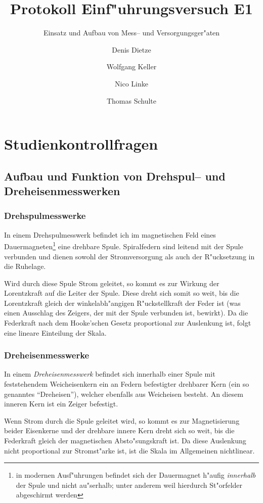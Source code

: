 \documentclass[10pt]{scrartcl}
\author{Denis Dietze \and Wolfgang Keller \and Nico Linke \and Thomas Schulte}
\title{Protokoll Einf"uhrungsversuch E1}
\subtitle{Einsatz und Aufbau von Mess-- und Versorgungsger"aten}
\begin{document}
\maketitle

\section{Studienkontrollfragen}

\subsection{Aufbau und Funktion von Drehspul-- und Dreheisenmesswerken}

\subsubsection{Drehspulmesswerke}

In einem Drehspulmesswerk befindet ich im magnetischen Feld eines Dauermagneten\footnote{in modernen Ausf"uhrungen befindet sich der Dauermagnet h"aufig \emph{innerhalb} der Spule und nicht au"serhalb; unter anderem weil hierdurch St"orfelder abgeschirmt werden} eine drehbare Spule. Spiralfedern sind leitend mit der Spule verbunden und dienen sowohl der Stromversorgung als auch der R"ucksetzung in die Ruhelage.

Wird durch diese Spule Strom geleitet, so kommt es zur Wirkung der Lorentzkraft auf die Leiter der Spule. Diese dreht sich somit so weit, bis die Lorentzkraft gleich der winkelabh"angigen R"uckstellkraft der Feder ist (was einen Ausschlag des Zeigers, der mit der Spule verbunden ist, bewirkt). Da die Federkraft nach dem Hooke'schen Gesetz proportional zur Auslenkung ist, folgt eine lineare Einteilung der Skala.

\subsubsection{Dreheisenmesswerke}

In einem \emph{Dreheisenmesswerk} befindet sich innerhalb einer Spule mit feststehendem Weicheisenkern ein an Federn befestigter drehbarer Kern (ein so genanntes "`Dreheisen"'), welcher ebenfalls aus Weicheisen besteht. An diesem inneren Kern ist ein Zeiger befestigt.

Wenn Strom durch die Spule geleitet wird, so kommt es zur Magnetisierung beider Eisenkerne und der drehbare innere Kern dreht sich so weit, bis die Federkraft gleich der magnetischen Absto"sungskraft ist. Da diese Auslenkung nicht proportional zur Stromst"arke ist, ist die Skala im Allgemeinen nichtlinear.
\end{document}

